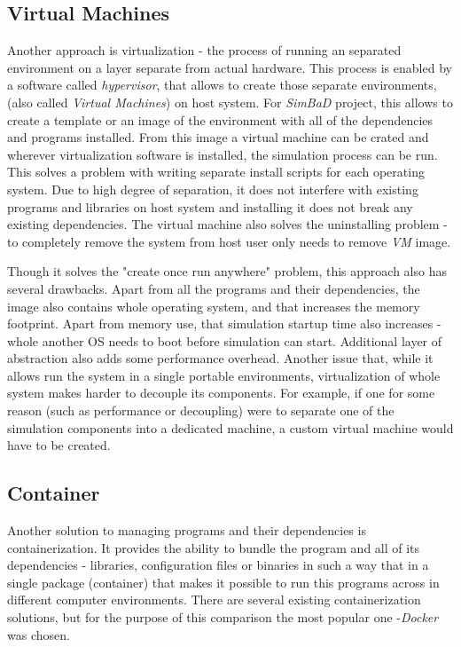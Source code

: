 \subsection{Virtual Machines}
Another approach is virtualization - the process of running an separated environment on a layer separate from actual hardware. This process is enabled by a software called \textit{hypervisor}, that allows to create those separate environments, (also called \textit{Virtual Machines}) on host system. For \textit{SimBaD} project, this allows to create a template or an image of the environment with all of the dependencies and programs installed. From this image a virtual machine can be crated and wherever virtualization software is installed, the simulation process can be run. This solves a problem with writing separate install scripts for each operating system. Due to high degree of separation, it does not interfere with existing programs and libraries on host system and installing it does not break any existing dependencies. The virtual machine also solves the uninstalling problem - to completely remove the system from host user only needs to remove \textit{VM} image. 

Though it solves the "create once run anywhere" problem, this approach also has several drawbacks. Apart from all the programs and their dependencies, the image also contains whole operating system, and that increases the memory footprint. Apart from memory use, that simulation startup time also increases - whole another OS needs to boot before simulation can start. Additional layer of abstraction also adds some performance overhead. Another issue that, while it allows run the system in a single portable environments, virtualization of whole system makes harder to decouple its components. For example, if one for some reason (such as performance or decoupling) were to separate one of the simulation components into a dedicated machine, a custom virtual machine would have to be created. 
\subsection{Container}
Another solution to managing programs and their dependencies is containerization. It provides the ability to bundle the program and all of its dependencies - libraries, configuration files or binaries in such a way that in a single package (container) that makes it possible to run this programs across in different computer environments. There are several existing containerization solutions, but for the purpose of this comparison the most popular one -\textit{Docker} was chosen.

